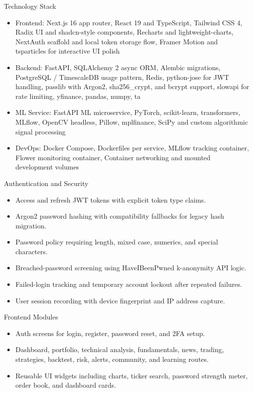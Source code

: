 \documentclass{beamer}
\begin{document}
\begin{frame}{Technology Stack}
\begin{itemize}
\item Frontend: Next.js 16 app router, React 19 and TypeScript, Tailwind CSS 4, Radix UI and shadcn-style components, Recharts and lightweight-charts, NextAuth scaffold and local token storage flow, Framer Motion and tsparticles for interactive UI polish
\item Backend: FastAPI, SQLAlchemy 2 async ORM, Alembic migrations, PostgreSQL / TimescaleDB usage pattern, Redis, python-jose for JWT handling, passlib with Argon2, sha256\_crypt, and bcrypt support, slowapi for rate limiting, yfinance, pandas, numpy, ta
\item ML Service: FastAPI ML microservice, PyTorch, scikit-learn, transformers, MLflow, OpenCV headless, Pillow, mplfinance, SciPy and custom algorithmic signal processing
\item DevOps: Docker Compose, Dockerfiles per service, MLflow tracking container, Flower monitoring container, Container networking and mounted development volumes
\end{itemize}
\end{frame}
\begin{frame}{Authentication and Security}
\begin{itemize}
\item Access and refresh JWT tokens with explicit token type claims.
\item Argon2 password hashing with compatibility fallbacks for legacy hash migration.
\item Password policy requiring length, mixed case, numerics, and special characters.
\item Breached-password screening using HaveIBeenPwned k-anonymity API logic.
\item Failed-login tracking and temporary account lockout after repeated failures.
\item User session recording with device fingerprint and IP address capture.
\end{itemize}
\end{frame}
\begin{frame}{Frontend Modules}
\begin{itemize}
\item Auth screens for login, register, password reset, and 2FA setup.
\item Dashboard, portfolio, technical analysis, fundamentals, news, trading, strategies, backtest, risk, alerts, community, and learning routes.
\item Reusable UI widgets including charts, ticker search, password strength meter, order book, and dashboard cards.
\end{itemize}
\end{frame}
\end{document}
